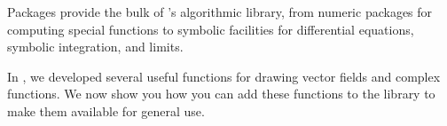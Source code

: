 
%
%
%
%
%

%

Packages provide the bulk of
\Language{}'s algorithmic library, from numeric packages for computing
special functions to symbolic facilities for
differential equations, symbolic integration, and limits.

In , we developed several useful functions for drawing
vector fields and complex functions.
We now show you how you can add these functions to the
\Language{} library to make them available for general use.

